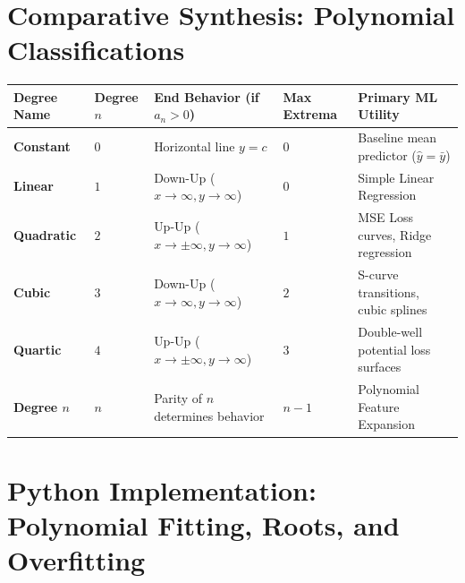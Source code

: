 \section{Comparative Synthesis: Polynomial Classifications}

\begin{center}
\renewcommand{\arraystretch}{1.3}
\begin{tabular}{p{2.5cm}p{1.8cm}p{3.5cm}p{2.2cm}p{3.8cm}}
\toprule
\textbf{Degree Name} & \textbf{Degree $n$} & \textbf{End Behavior (if $a_n > 0$)} & \textbf{Max Extrema} & \textbf{Primary ML Utility} \\
\midrule
\textbf{Constant} & $0$ & Horizontal line $y = c$ & $0$ & Baseline mean predictor ($\hat{y} = \bar{y}$) \\
\textbf{Linear} & $1$ & Down-Up ($x \to \infty, y \to \infty$) & $0$ & Simple Linear Regression \\
\textbf{Quadratic} & $2$ & Up-Up ($x \to \pm\infty, y \to \infty$) & $1$ & MSE Loss curves, Ridge regression \\
\textbf{Cubic} & $3$ & Down-Up ($x \to \infty, y \to \infty$) & $2$ & S-curve transitions, cubic splines \\
\textbf{Quartic} & $4$ & Up-Up ($x \to \pm\infty, y \to \infty$) & $3$ & Double-well potential loss surfaces \\
\textbf{Degree $n$} & $n$ & Parity of $n$ determines behavior & $n - 1$ & Polynomial Feature Expansion \\
\bottomrule
\end{tabular}
\end{center}

\section{Python Implementation: Polynomial Fitting, Roots, and Overfitting}

